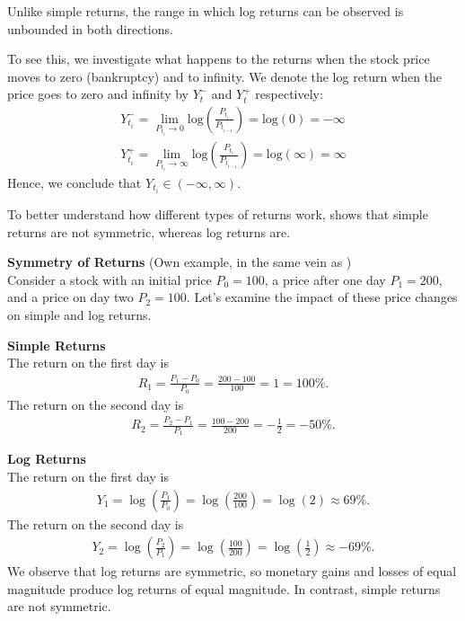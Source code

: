 Unlike simple returns, the range in which log returns can be observed is unbounded in both directions. 
\begin{example}
    To see this, we investigate what happens to the returns when the stock price moves to zero (bankruptcy) and to infinity. We denote the log return when the price goes to zero and infinity by $Y_t^-$ and $Y_t^+$ respectively:   
    \begin{align*}
        Y_{t_i}^- = \lim_{P_{t_i} \to 0} \mathrm{log} \left( \frac{P_{t_i}}{P_{t_{i-1}}} \right) = \mathrm{log}(0) = -\infty \\
        Y_{t_i}^+ = \lim_{P_{t_i} \to \infty} \mathrm{log} \left( \frac{P_{t_i}}{P_{t_{i-1}}} \right) = \mathrm{log}(\infty) = \infty    
    \end{align*}
    Hence, we conclude that $Y_{t_i} \in (-\infty,\infty)$. 
\end{example}

To better understand how different types of returns work,  shows that simple returns are not symmetric, whereas log returns are. 
\begin{example}\label{ex:returnSymmetry}
    \textbf{Symmetry of Returns} (Own example, in the same vein as \citet[p.~4]{Danielsson2011}) \\
    Consider a stock with an initial price $P_0 = 100$, a price after one day $P_1 = 200$, and a price on day two $P_2 = 100$. Let's examine the impact of these price changes on simple and log returns.

    \textbf{Simple Returns}\\
    The return on the first day is
    \begin{align*}
        R_1 = \frac{P_1 - P_0}{P_0} = \frac{200 - 100}{100} = 1 = 100\%.
    \end{align*}
    The return on the second day is
    \begin{align*}
        R_2 = \frac{P_2 - P_1}{P_1} = \frac{100 - 200}{200} = -\frac{1}{2} = -50\%.
    \end{align*}    

    \textbf{Log Returns}\\
    The return on the first day is 
    \begin{align*}
        Y_1 = \log \left( \frac{P_1}{P_0} \right) = \log\left( \frac{200}{100} \right) = \log(2) \approx 69\%.
    \end{align*}
    The return on the second day is
    \begin{align*}
        Y_2 = \log \left( \frac{P_2}{P_1} \right) = \log \left( \frac{100}{200} \right) = \log\left( \frac{1}{2} \right) \approx -69\%.
    \end{align*}
    We observe that log returns are symmetric, so monetary gains and losses of equal magnitude produce log returns of equal magnitude. In contrast, simple returns are not symmetric.
\end{example}


